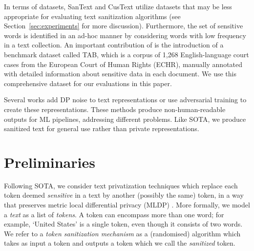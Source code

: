 \documentclass[11pt]{article}
\begin{document}
In terms of datasets, SanText and CusText utilize datasets that may be less appropriate for evaluating text sanitization algorithms (see Section~\ref{sec:experiments} for more discussion). 
Furthermore, the set of sensitive words is identified in an ad-hoc manner by considering words with low frequency in a text collection.
An important contribution of \cite{pilan2022text} is the introduction of a benchmark dataset called TAB, which is a corpus of 1,268 English-language court cases from the European Court of Human Rights (ECHR), manually annotated with detailed information about sensitive data in each document.
We use this comprehensive dataset for our evaluations in this paper. 




Several works add 
DP noise to text representations \cite{feyisetan2019leveraging, feyisetan2020privacy, lyu2020differentially, lyu2020towards} or use adversarial training \cite{xie2017controllable, coavoux2018privacy, elazar2018adversarial, li2018towards} to create these representations.
These methods produce non-human-readable outputs for ML pipelines, addressing different problems. Like SOTA, we produce sanitized text for general use rather than private representations.


\section{Preliminaries}
\label{sec:prelim}


Following SOTA, we consider text privatization techniques which replace each token deemed {\em sensitive} in a text by another (possibly the same) token, in a way that preserves metric local differential privacy (MLDP) \cite{alvim2018local}. 
More formally, we model a {\em text} as a list of {\em tokens}.  
A token can encompass more than one word; for example, `United States' is a single token, even though it consists of two words. 
We refer to a {\em token sanitization mechanism} as a (randomised) algorithm which takes as input a token and outputs a token which we call the {\em sanitized} token.
\end{document}
